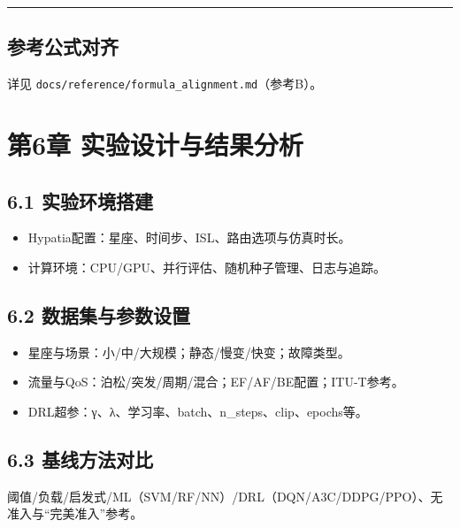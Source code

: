 \begin{center}\rule{0.5\linewidth}{0.5pt}\end{center}

\subsection{参考公式对齐}\label{ux53c2ux8003ux516cux5f0fux5bf9ux9f50-2}

详见 \texttt{docs/reference/formula\_alignment.md}（参考B）。

\section{第6章
实验设计与结果分析}\label{ux7b2c6ux7ae0-ux5b9eux9a8cux8bbeux8ba1ux4e0eux7ed3ux679cux5206ux6790}

\subsection{6.1
实验环境搭建}\label{ux5b9eux9a8cux73afux5883ux642dux5efa}

\begin{itemize}
\tightlist
\item
  Hypatia配置：星座、时间步、ISL、路由选项与仿真时长。
\item
  计算环境：CPU/GPU、并行评估、随机种子管理、日志与追踪。
\end{itemize}

\subsection{6.2
数据集与参数设置}\label{ux6570ux636eux96c6ux4e0eux53c2ux6570ux8bbeux7f6e}

\begin{itemize}
\tightlist
\item
  星座与场景：小/中/大规模；静态/慢变/快变；故障类型。
\item
  流量与QoS：泊松/突发/周期/混合；EF/AF/BE配置；ITU-T参考。
\item
  DRL超参：γ、λ、学习率、batch、n\_steps、clip、epochs等。
\end{itemize}

\subsection{6.3
基线方法对比}\label{ux57faux7ebfux65b9ux6cd5ux5bf9ux6bd4}

阈值/负载/启发式/ML（SVM/RF/NN）/DRL（DQN/A3C/DDPG/PPO）、无准入与``完美准入''参考。

